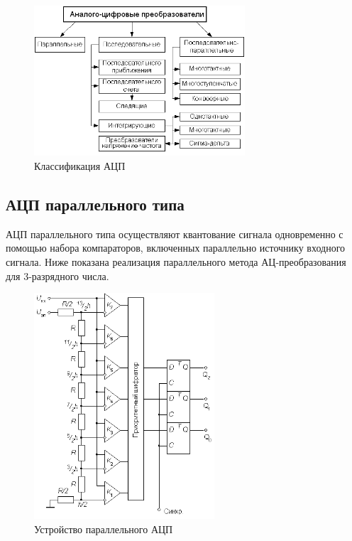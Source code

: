 \documentclass[unicode, 12pt, a4paper, oneside]{article}
\begin{document}
\begin{figure}[H]
\centering
\includegraphics[width=0.7\textwidth]{16_ADC_scheme.png}
\caption{Классификация АЦП}
\label{fig:16_ADC_scheme}
\end{figure}

\subsection*{АЦП параллельного типа}
АЦП параллельного типа осуществляют квантование сигнала одновременно с помощью набора компараторов, включенных параллельно источнику входного сигнала. Ниже показана реализация параллельного метода АЦ-преобразования для 3-разрядного числа.

\begin{figure}[H]
\centering
\includegraphics[width=0.6\textwidth]{16_parallel_ADC.png}
\caption{Устройство параллельного АЦП}
\label{fig:16_parallel_ADC}
\end{figure}
\end{document}
